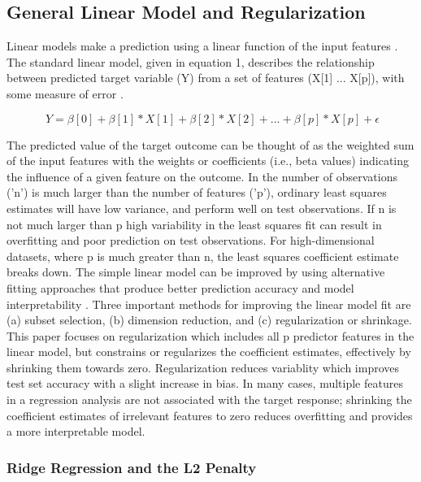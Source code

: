 \documentclass[sigconf]{acmart}
\begin{document}
\subsection{General Linear Model and Regularization} 

Linear models make a prediction using a linear function of the input features
\cite{muller17}. The standard linear model, given in equation 1, describes the
relationship between predicted target variable (Y) from a set of features 
(X[1] ... X[p]), with some measure of error . 

\begin{equation}
  \ Y = \beta[0] + \beta[1]*X[1] + \beta[2]*X[2] +... + \beta[p]*X[p] + \epsilon
\end{equation}

The predicted value of the target outcome can be thought of as the weighted 
sum of the input features with the weights or coefficients (i.e., beta values) 
indicating the influence of a given feature on the outcome. In the number of
observations ('n') is much larger than the number of features ('p'), ordinary 
least squares estimates will have low variance, and perform well on test
observations. If n is not much larger than p high variability in the least
squares fit can result in overfitting and poor prediction on test observations.
For high-dimensional datasets, where p is much greater than n, the least
squares coefficient estimate breaks down. The simple linear model can be
improved by using alternative fitting approaches that produce better 
prediction accuracy and model interpretability \cite{statlearn13}. Three
important methods for improving the linear model fit are (a) subset selection,
(b) dimension reduction, and (c) regularization or shrinkage. This paper 
focuses on regularization which includes all p predictor features in the
linear model, but constrains or regularizes the coefficient estimates, 
effectively by shrinking them towards zero. Regularization reduces variablity 
which improves test set accuracy with a slight increase in bias. In many cases, 
multiple features in a regression analysis are not associated with the target
response; shrinking the coefficient estimates of irrelevant features to zero 
reduces overfitting and provides a more interpretable model. 

\subsubsection{Ridge Regression and the L2 Penalty} 
\end{document}
